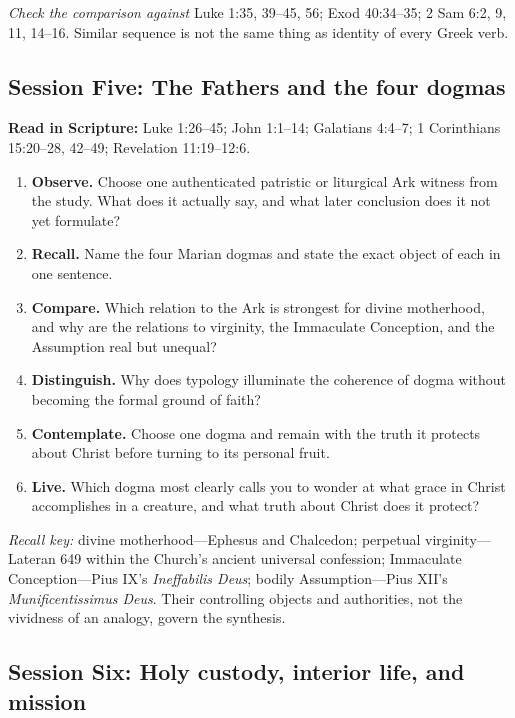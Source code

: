 \textit{Check the comparison against} Luke 1:35, 39--45, 56; Exod 40:34--35;
2 Sam 6:2, 9, 11, 14--16.  Similar sequence is not the same thing as identity
of every Greek verb.

\subsection{Session Five: The Fathers and the four dogmas}

\textbf{Read in Scripture:} Luke 1:26--45; John 1:1--14; Galatians 4:4--7;
1 Corinthians 15:20--28, 42--49; Revelation 11:19--12:6.

\begin{enumerate}
  \item \textbf{Observe.} Choose one authenticated patristic or liturgical Ark
  witness from the study.  What does it actually say, and what later conclusion
  does it not yet formulate?
  \item \textbf{Recall.} Name the four Marian dogmas and state the exact object
  of each in one sentence.
  \item \textbf{Compare.} Which relation to the Ark is strongest for divine
  motherhood, and why are the relations to virginity, the Immaculate
  Conception, and the Assumption real but unequal?
  \item \textbf{Distinguish.} Why does typology illuminate the coherence of dogma
  without becoming the formal ground of faith?
  \item \textbf{Contemplate.} Choose one dogma and remain with the truth it
  protects about Christ before turning to its personal fruit.
  \item \textbf{Live.} Which dogma most clearly calls you to wonder at what
  grace in Christ accomplishes in a creature, and what truth about Christ does
  it protect?
\end{enumerate}

\textit{Recall key:} divine motherhood---Ephesus and Chalcedon; perpetual
virginity---Lateran 649 within the Church's ancient universal confession;
Immaculate Conception---Pius IX's \emph{Ineffabilis Deus}; bodily
Assumption---Pius XII's \emph{Munificentissimus Deus}.  Their controlling
objects and authorities, not the vividness of an analogy, govern the synthesis.

\subsection{Session Six: Holy custody, interior life, and mission}

